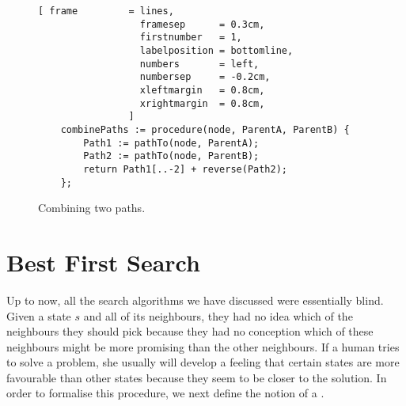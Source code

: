 \begin{figure}[!ht]
\centering
\begin{Verbatim}[ frame         = lines,
                  framesep      = 0.3cm,
                  firstnumber   = 1,
                  labelposition = bottomline,
                  numbers       = left,
                  numbersep     = -0.2cm,
                  xleftmargin   = 0.8cm,
                  xrightmargin  = 0.8cm,
                ]
    combinePaths := procedure(node, ParentA, ParentB) {
        Path1 := pathTo(node, ParentA);
        Path2 := pathTo(node, ParentB);
        return Path1[..-2] + reverse(Path2);
    };
\end{Verbatim}
\vspace*{-0.3cm}
\caption{Combining two paths.}
\label{fig:combine-paths.stlx}
\end{figure}
\pagebreak

\section{Best First Search}
Up to now, all the search algorithms we have discussed were essentially blind.  Given a state $s$ and
all of its neighbours, they had no idea which of the neighbours they should pick because they had no conception
which of these neighbours might be more promising than the other neighbours.  If a human tries to solve a
problem, she usually will develop a feeling that certain states are more favourable than other states because
they seem to be closer to the solution.  In order to formalise this procedure, we next define the notion of a
.
\pagebreak

